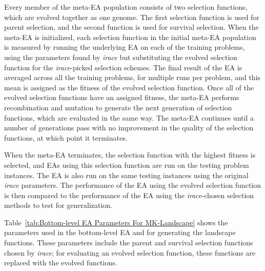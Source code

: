 \documentclass[times,12pt,titlepage]{mstogs}
\begin{document}
\begin{ThesisBody}
Every member of the meta-EA population consists of two selection functions, which are evolved together as one genome. The first selection function is used for parent selection, and the second function is used for survival selection. When the meta-EA is initialized, each selection function in the initial meta-EA population is measured by running the underlying EA on each of the training problems, using the parameters found by \textit{irace} but substituting the evolved selection function for the \textit{irace}-picked selection schemes. The final result of the EA is averaged across all the training problems, for multiple runs per problem, and this mean is assigned as the fitness of the evolved selection function. Once all of the evolved selection functions have an assigned fitness, the meta-EA performs recombination and mutation to generate the next generation of selection functions, which are evaluated in the same way. The meta-EA continues until a number of generations pass with no improvement in the quality of the selection functions, at which point it terminates.

When the meta-EA terminates, the selection function with the highest fitness is selected, and EAs using this selection function are run on the testing problem instances. The EA is also run on the same testing instances using the original \textit{irace} parameters. The performance of the EA using the evolved selection function is then compared to the performance of the EA using the \textit{irace}-chosen selection methods to test for generalization.

Table~\ref{tab:Bottom-level EA Parameters For MK-Landscape} shows the parameters used in the bottom-level EA and for generating the landscape functions. These parameters include the parent and survival selection functions chosen by \textit{irace}; for evaluating an evolved selection function, these functions are replaced with the evolved functions.


\end{ThesisBody}
\end{document}
